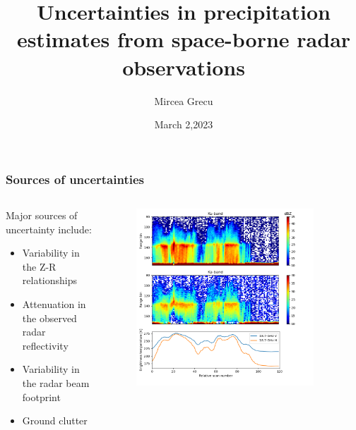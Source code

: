 \documentclass{beamer}
\title{Uncertainties in precipitation
estimates from space-borne radar observations}
\author{Mircea Grecu}
\institute{NASA Goddard Space Flight Center and Morgan State University}
\date{March 2,2023}
\begin{document}
\frame{\titlepage}
\begin{frame}
\frametitle{Sources of uncertainties}
\begin{columns}
\begin{column}{0.45\textwidth}
    Major sources of uncertainty include:
    \begin{itemize}
        \item Variability in the Z-R relationships
        \item Attenuation in the observed radar reflectivity
        \item Variability in the radar beam footprint
        \item Ground clutter
    \end{itemize}
\end{column}
\begin{column}{0.55\textwidth}  %
    \begin{figure}
    \begin{center}
     \includegraphics[width=0.9\textwidth]{Figures/fig1.png}
     \end{center}
    \end{figure}
\end{column}
\end{columns}
\end{frame}
\end{document}
